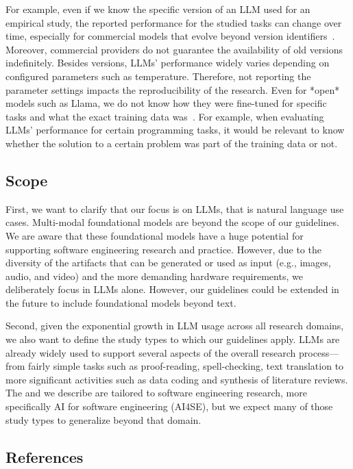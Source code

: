 For example, even if we know the specific version of an LLM used for an empirical study, the reported performance for the studied tasks can change over time, especially for commercial models that evolve beyond version identifiers~\cite{DBLP:journals/corr/abs-2307-09009}.
Moreover, commercial providers do not guarantee the availability of old versions indefinitely.
Besides versions, LLMs' performance widely varies depending on configured parameters such as temperature.
Therefore, not reporting the parameter settings impacts the reproducibility of the research.
Even for *open* models such as Llama, we do not know how they were fine-tuned for specific tasks and what the exact training data was~\cite{Gibney2024}.
For example, when evaluating LLMs' performance for certain programming tasks, it would be relevant to know whether the solution to a certain problem was part of the training data or not.


\subsection{Scope}

First, we want to clarify that our focus is on LLMs, that is natural language use cases.
Multi-modal foundational models are beyond the scope of our guidelines.
We are aware that these foundational models have a huge potential for supporting software engineering research and practice.
However, due to the diversity of  the artifacts that can be generated or used as input (e.g., images, audio, and video) and the more demanding hardware requirements, we deliberately focus in LLMs alone.
However, our guidelines could be extended in the future to include foundational models beyond text.

Second, given the exponential growth in LLM usage across all research domains, we also want to define the study types to which our guidelines apply.
LLMs are already widely used to support several aspects of the overall research process---from fairly simple tasks such as proof-reading, spell-checking, text translation to more significant activities such as data coding and synthesis of literature reviews.
The \studytypes and \guidelines we describe are tailored to software engineering research, more specifically AI for software engineering (AI4SE), but we expect many of those study types to generalize beyond that domain.

\subsection{References}





